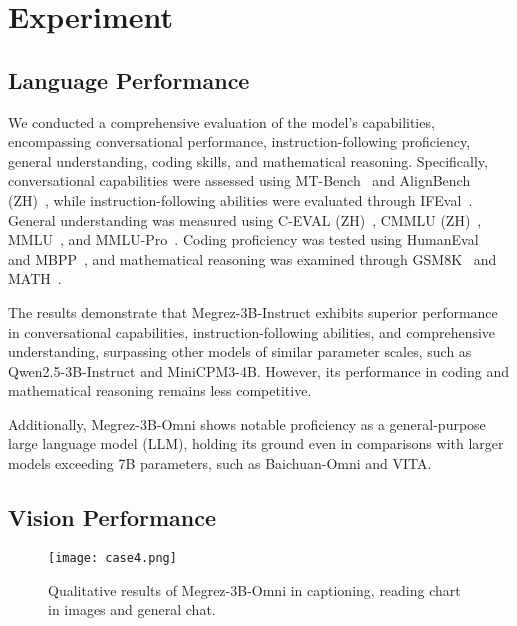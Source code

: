 \newcommand{\ouromni}[0]{Megrez-3B-Omni\ }
\newcommand{\ouromnis}[0]{Megrez-3B-Omni's\ }

\section{Experiment}

\subsection{Language Performance}
We conducted a comprehensive evaluation of the model's capabilities, encompassing conversational performance, instruction-following proficiency, general understanding, coding skills, and mathematical reasoning. Specifically, conversational capabilities were assessed using MT-Bench~\cite{zheng2024judging} and AlignBench (ZH)~\cite{liu2023alignbench}, while instruction-following abilities were evaluated through IFEval~\cite{zhou2023instruction}. General understanding was measured using C-EVAL (ZH)~\cite{huang2024c}, CMMLU (ZH)~\cite{li2023cmmlu}, MMLU~\cite{hendrycks2020measuring}, and MMLU-Pro~\cite{wang2406mmlu}. Coding proficiency was tested using HumanEval~\cite{chen2021codex} and MBPP~\cite{austin2021program}, and mathematical reasoning was examined through GSM8K~\cite{cobbe2021gsm8k} and MATH~\cite{hendrycks2021measuring}.




The results demonstrate that Megrez-3B-Instruct exhibits superior performance in conversational capabilities, instruction-following abilities, and comprehensive understanding, surpassing other models of similar parameter scales, such as Qwen2.5-3B-Instruct and MiniCPM3-4B. However, its performance in coding and mathematical reasoning remains less competitive.

Additionally, Megrez-3B-Omni shows notable proficiency as a general-purpose large language model (LLM), holding its ground even in comparisons with larger models exceeding 7B parameters, such as Baichuan-Omni and VITA.


\subsection{Vision Performance}

\begin{figure}[htbp]
  \centering
  \texttt{[image: case4.png]}
  \caption{Qualitative results of Megrez-3B-Omni in captioning, reading chart in images and general chat.}
  \label{fig:case4}
\end{figure}

